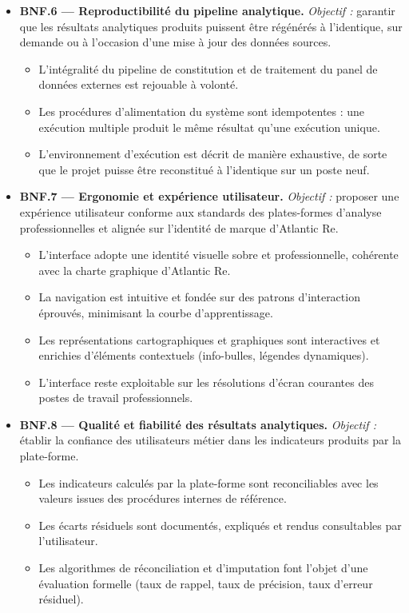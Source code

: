 \documentclass[../main.tex]{subfiles}
\begin{document}
\begin{itemize}[leftmargin=1.5cm, itemsep=6pt]
  \item \textbf{BNF.6 --- Reproductibilité du pipeline analytique.}
  \emph{Objectif :} garantir que les résultats analytiques produits puissent être régénérés à l'identique, sur demande ou à l'occasion d'une mise à jour des données sources.
  \begin{itemize}[label=\textendash, itemsep=2pt]
    \item L'intégralité du pipeline de constitution et de traitement du panel de données externes est rejouable à volonté.
    \item Les procédures d'alimentation du système sont idempotentes : une exécution multiple produit le même résultat qu'une exécution unique.
    \item L'environnement d'exécution est décrit de manière exhaustive, de sorte que le projet puisse être reconstitué à l'identique sur un poste neuf.
  \end{itemize}

  \item \textbf{BNF.7 --- Ergonomie et expérience utilisateur.}
  \emph{Objectif :} proposer une expérience utilisateur conforme aux standards des plates-formes d'analyse professionnelles et alignée sur l'identité de marque d'Atlantic Re.
  \begin{itemize}[label=\textendash, itemsep=2pt]
    \item L'interface adopte une identité visuelle sobre et professionnelle, cohérente avec la charte graphique d'Atlantic Re.
    \item La navigation est intuitive et fondée sur des patrons d'interaction éprouvés, minimisant la courbe d'apprentissage.
    \item Les représentations cartographiques et graphiques sont interactives et enrichies d'éléments contextuels (info-bulles, légendes dynamiques).
    \item L'interface reste exploitable sur les résolutions d'écran courantes des postes de travail professionnels.
  \end{itemize}

  \item \textbf{BNF.8 --- Qualité et fiabilité des résultats analytiques.}
  \emph{Objectif :} établir la confiance des utilisateurs métier dans les indicateurs produits par la plate-forme.
  \begin{itemize}[label=\textendash, itemsep=2pt]
    \item Les indicateurs calculés par la plate-forme sont reconciliables avec les valeurs issues des procédures internes de référence.
    \item Les écarts résiduels sont documentés, expliqués et rendus consultables par l'utilisateur.
    \item Les algorithmes de réconciliation et d'imputation font l'objet d'une évaluation formelle (taux de rappel, taux de précision, taux d'erreur résiduel).
  \end{itemize}

\end{itemize}
\end{document}
